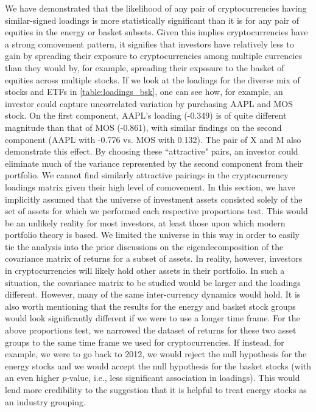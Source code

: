 \documentclass[12pt,twoside]{article}
\begin{document}
We have demonstrated that the likelihood of any pair of cryptocurrencies having similar-signed loadings is more statistically significant than it is for any pair of equities in the energy or basket subsets. Given this implies cryptocurrencies have a strong comovement pattern, it signifies that investors have relatively less to gain by spreading their exposure to cryptocurrencies among multiple currencies than they would by, for example, spreading their exposure to the basket of equities across multiple stocks. If we look at the loadings for the diverse mix of stocks and ETFs in \ref{table:loadings_bsk}, one can see how, for example, an investor could capture uncorrelated variation by purchasing AAPL and MOS stock. On the first component, AAPL's loading (-0.349) is of quite different magnitude than that of MOS (-0.861), with similar findings on the second component (AAPL with -0.776 vs. MOS with 0.132). The pair of X and M also demonstrate this effect. By choosing these ``attractive" pairs, an investor could eliminate much of the variance represented by the second component from their portfolio. We cannot find similarly attractive pairings in the cryptocurrency loadings matrix given their high level of comovement.
\bigbreak
In this section, we have implicitly assumed that the universe of investment assets consisted solely of the set of assets for which we performed each respective proportions test. This would be an unlikely reality for most investors, at least those upon which modern portfolio theory is based. We limited the universe in this way in order to easily tie the analysis into the prior discussions on the eigendecomposition of the covariance matrix of returns for a subset of assets. In reality, however, investors in cryptocurrencies will likely hold other assets in their portfolio. In such a situation, the covariance matrix to be studied would be larger and the loadings different. However, many of the same inter-currency dynamics would hold. It is also worth mentioning that the results for the energy and basket stock groups would look significantly different if we were to use a longer time frame. For the above proportions test, we narrowed the dataset of returns for these two asset groups to the same time frame we used for cryptocurrencies. If instead, for example, we were to go back to 2012, we would reject the null hypothesis for the energy stocks and we would accept the null hypothesis for the basket stocks (with an even higher $p$-value, i.e., less significant association in loadings). This would lend more credibility to the suggestion that it is helpful to treat energy stocks as an industry grouping.
\end{document}
